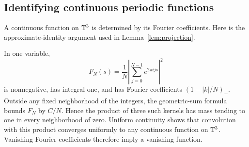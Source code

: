 \subsection{Identifying continuous periodic functions}\label{app:fourier}
A continuous function on $\mathbb T^3$ is determined by its Fourier
coefficients. Here is the approximate-identity argument used in
Lemma~\ref{lem:projection}.

In one variable,
\[
 F_N(s)=\frac1N\left|\sum_{j=0}^{N-1}e^{2\pi i js}\right|^2
\]
is nonnegative, has integral one, and has Fourier coefficients
$(1-|k|/N)_+$. Outside any fixed neighborhood of the integers,
the geometric-sum formula bounds $F_N$ by $C/N$. Hence the product
of three such kernels has mass tending to one in every neighborhood
of zero. Uniform continuity shows that convolution with this product
converges uniformly to any continuous function on $\mathbb T^3$.
Vanishing Fourier coefficients therefore imply a vanishing function.
